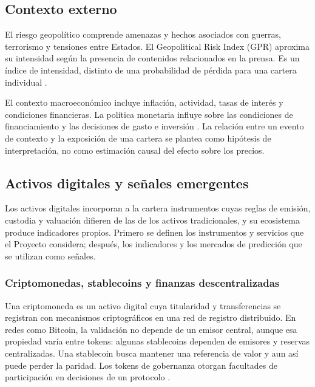 \subsection{Contexto externo}\label{subsec:riesgo-geopolitico}

El riesgo geopolítico comprende amenazas y hechos asociados con guerras, terrorismo y tensiones entre Estados. El Geopolitical Risk Index (GPR) aproxima su intensidad según la presencia de contenidos relacionados en la prensa. Es un índice de intensidad, distinto de una probabilidad de pérdida para una cartera individual \parencite{CaldaraIacoviello2022}.

El contexto macroeconómico incluye inflación, actividad, tasas de interés y condiciones financieras. La política monetaria influye sobre las condiciones de financiamiento y las decisiones de gasto e inversión \parencite{FedMonetary}. La relación entre un evento de contexto y la exposición de una cartera se plantea como hipótesis de interpretación, no como estimación causal del efecto sobre los precios.

\subsection{Activos digitales y señales emergentes}\label{subsec:cripto}

Los activos digitales incorporan a la cartera instrumentos cuyas reglas de emisión, custodia y valuación difieren de las de los activos tradicionales, y su ecosistema produce indicadores propios. Primero se definen los instrumentos y servicios que el Proyecto considera; después, los indicadores y los mercados de predicción que se utilizan como señales.

\subsubsection{Criptomonedas, stablecoins y finanzas descentralizadas}

Una criptomoneda es un activo digital cuya titularidad y transferencias se registran con mecanismos criptográficos en una red de registro distribuido. En redes como Bitcoin, la validación no depende de un emisor central, aunque esa propiedad varía entre tokens: algunas stablecoins dependen de emisores y reservas centralizadas. Una stablecoin busca mantener una referencia de valor y aun así puede perder la paridad. Los tokens de gobernanza otorgan facultades de participación en decisiones de un protocolo \parencite{Schar2021,FedBlockchain}.


